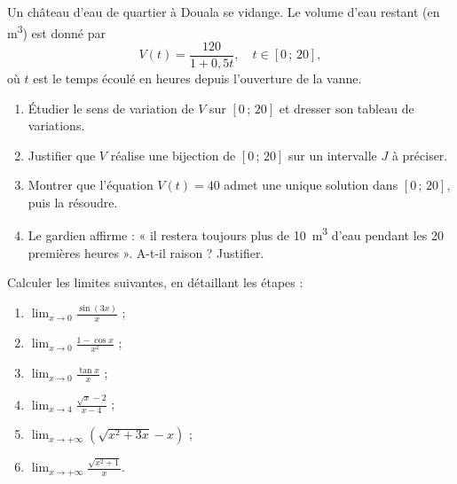 \documentclass[11pt]{article}
\begin{document}
\begin{exercice}
Un château d'eau de quartier à Douala se vidange. Le volume d'eau restant (en \si{\meter\cubed}) est donné par
\[ V(t)=\frac{120}{1+0{,}5t}, \quad t\in[0\,;\,20], \]
où $t$ est le temps écoulé en heures depuis l'ouverture de la vanne.
\begin{enumerate}
\item Étudier le sens de variation de $V$ sur $[0\,;\,20]$ et dresser son tableau de variations.
\item Justifier que $V$ réalise une bijection de $[0\,;\,20]$ sur un intervalle $J$ à préciser.
\item Montrer que l'équation $V(t)=40$ admet une unique solution dans $[0\,;\,20]$, puis la résoudre.
\item Le gardien affirme : « il restera toujours plus de \SI{10}{\meter\cubed} d'eau pendant les 20 premières heures ». A-t-il raison ? Justifier.
\end{enumerate}
\end{exercice}

\begin{exercice}
Calculer les limites suivantes, en détaillant les étapes :
\begin{enumerate}
\item $\displaystyle\lim_{x\to 0}\frac{\sin(3x)}{x}$ ;
\item $\displaystyle\lim_{x\to 0}\frac{1-\cos x}{x^2}$ ;
\item $\displaystyle\lim_{x\to 0}\frac{\tan x}{x}$ ;
\item $\displaystyle\lim_{x\to 4}\frac{\sqrt{x}-2}{x-4}$ ;
\item $\displaystyle\lim_{x\to +\infty}\left(\sqrt{x^2+3x}-x\right)$ ;
\item $\displaystyle\lim_{x\to +\infty}\frac{\sqrt{x^2+1}}{x}$.
\end{enumerate}
\end{exercice}
\end{document}
